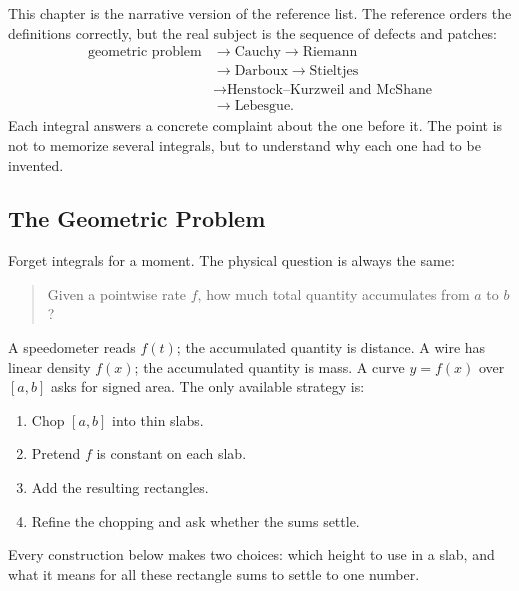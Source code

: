 \begin{remark*}[Interpretation]
This chapter is the narrative version of the reference list. The reference
orders the definitions correctly, but the real subject is the sequence of
defects and patches:
\[
\begin{aligned}
  \text{geometric problem}&\to \text{Cauchy}\to \text{Riemann}\\
  &\to \text{Darboux}\to \text{Stieltjes}\\
  &\to \text{Henstock--Kurzweil and McShane}\\
  &\to \text{Lebesgue}.
\end{aligned}
\]
Each integral answers a concrete complaint about the one before it. The point
is not to memorize several integrals, but to understand why each one had to be
invented.
\end{remark*}

\subsection*{The Geometric Problem}

\begin{exposition}
Forget integrals for a moment. The physical question is always the same:

\begin{quote}
Given a pointwise rate \(f\), how much total quantity accumulates from
\(a\) to \(b\)?
\end{quote}

A speedometer reads \(f(t)\); the accumulated quantity is distance. A wire has
linear density \(f(x)\); the accumulated quantity is mass. A curve \(y=f(x)\)
over \([a,b]\) asks for signed area. The only available strategy is:

\begin{enumerate}
  \item Chop \([a,b]\) into thin slabs.
  \item Pretend \(f\) is constant on each slab.
  \item Add the resulting rectangles.
  \item Refine the chopping and ask whether the sums settle.
\end{enumerate}

Every construction below makes two choices: which height to use in a slab, and
what it means for all these rectangle sums to settle to one number.
\end{exposition}

